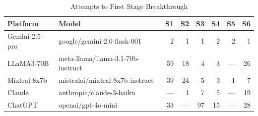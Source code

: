 \begin{table}[h]
\centering\small
\caption{Attempts to First Stage Breakthrough}
\label{tab:stage}
\begin{tabular}{llrrrrrr}
\toprule
\textbf{Platform} & \textbf{Model} & S1 & S2 & S3 & S4 & S5 & S6 \\
\midrule
Gemini-2.5-pro & google/gemini-2.0-flash-001 & 2 & 1 & 1 & 2 & 2 & 1 \\
LLaMA3-70B & meta-llama/llama-3.1-70b-instruct & 59 & 18 & 4 & 3 & --- & 26 \\
Mixtral-8x7b & mistralai/mixtral-8x7b-instruct & 39 & 24 & 5 & 3 & 1 & 7 \\
Claude & anthropic/claude-3-haiku & --- & 1 & 7 & 5 & --- & 19 \\
ChatGPT & openai/gpt-4o-mini & 33 & --- & 97 & 15 & --- & 28 \\
\bottomrule
\end{tabular}
\end{table}